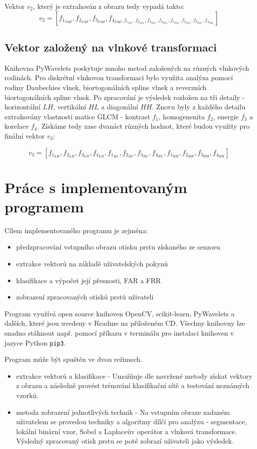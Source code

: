 Vektor $v_2$, který je extrahován z obrazu tedy vypadá takto:
$$v_2 = [f_{1_{Lapl}}, f_{2_{Lapl}}, f_{3_{Lapl}}, f_{4_{Lapl}, f_{1_{Sob_x}}, f_{2_{Sob_x}}, f_{3_{Sob_x}}, f_{4_{Sob_x}}, f_{1_{Sob_y}}, f_{2_{Sob_y}}, f_{3_{Sob_y}}, f_{4_{Sob_y}}}]$$

\subsection{Vektor založený na vlnkové transformaci}
Knihovna PyWavelets poskytuje mnoho metod založených na různých vlnkových rodinách. Pro diskrétní vlnkovou transformaci bylo využita analýza pomocí rodiny Daubechies vlnek, biortogonálních spline vlnek a reverzních biortogonálních spline vlnek. Po zpracování je výsledek rozložen na tři detaily - horizontální $LH$, vertikální $HL$ a diagonální $HH$. Znovu byly z každého detailu extrahovány vlastnosti matice GLCM - kontrast $f_1$, homogenenita $f_2$, energie $f_3$ a korelace $f_4$. Získáme tedy zase dvanáct různých hodnot, které budou využity pro finální vektor $v_3$:

$$v_3 = [f_{1_{LH}}, f_{2_{LH}}, f_{3_{LH}}, f_{4_{LH}}, f_{1_{HL}}, f_{2_{HL}}, f_{3_{HL}}, f_{4_{HL}}, f_{1_{HH}}, f_{2_{HH}}, f_{3_{HH}}, f_{4_{HH}}]$$

\section{Práce s implementovaným programem}
Cílem implementovaného programu je zejména:
\begin{itemize}
    \item předzpracování vstupního obrazu otisku prstu získaného ze senzoru
    \item extrakce vektorů na základě uživatelských pokynů
    \item klasifikace a výpočet její přesnosti, FAR a FRR
    \item zobrazení zpracovaných otisků prstů uživateli
\end{itemize}

Program využívá open source knihoven OpenCV, scikit-learn, PyWavelets a dalších, které jsou uvedeny v Readme na přiloženém CD. Všechny knihovny lze snadno stáhnout např. pomocí příkazu v terminálu pro instalaci knihoven v jazyce Python \verb|pip3|. 

Program může být spuštěn ve dvou režimech.
\begin{itemize}
    \item extrakce vektorů a klasifikace - Umožňuje dle navržené metody získat vektory z obrazu a následně provést trénování klasifikační sítě a testování neznámých vzorků.
    \item metoda zobrazení jednotlivých technik - Na vstupním obraze zadaném uživatelem se provedou techniky a algoritmy dílčí pro analýzu - segmentace, lokální binární vzor, Sobel a Laplaceův operátor a vlnková transformace. Výsledný zpracovaný otisk prstu se poté zobrazí uživateli jako výsledek.
\end{itemize}

